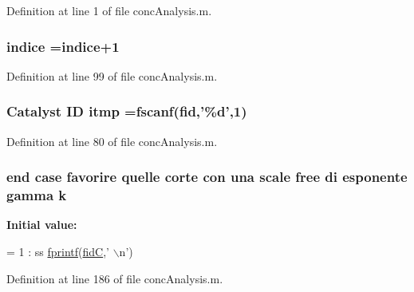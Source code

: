 Definition at line 1 of file conc\-Analysis.\-m.

\hypertarget{a00025_a776b2bbd08be028d44f6d4260f27633a}{
\subsubsection[{indice}]{ indice =indice+1}}\label{a00025_a776b2bbd08be028d44f6d4260f27633a}


Definition at line 99 of file conc\-Analysis.\-m.

\hypertarget{a00025_af17812863fb385a507b5b07ed6166569}{
\subsubsection[{itmp}]{\setlength{\rightskip}{0pt plus 5cm}Catalyst I\-D itmp ={\bf fscanf}({\bf fid},'\%d',1)}}\label{a00025_af17812863fb385a507b5b07ed6166569}


Definition at line 80 of file conc\-Analysis.\-m.

\hypertarget{a00025_ab7005e24e9bb6ea9b6e14c4ac2614a31}{
\subsubsection[{k}]{ {\bf end} case favorire quelle corte con una scale free di esponente gamma k}}\label{a00025_ab7005e24e9bb6ea9b6e14c4ac2614a31}
{\bfseries Initial value\-:}
\begin{DoxyCode}
= 1 : ss    
            \hyperlink{a00027_a21172d88d238291f06b91067ea53f814}{fprintf}(\hyperlink{a00025_a5650dbe23ad9065391c1ea56f8acd34c}{fidC},\textcolor{stringliteral}{' \(\backslash\)n'})
\end{DoxyCode}


Definition at line 186 of file conc\-Analysis.\-m.

